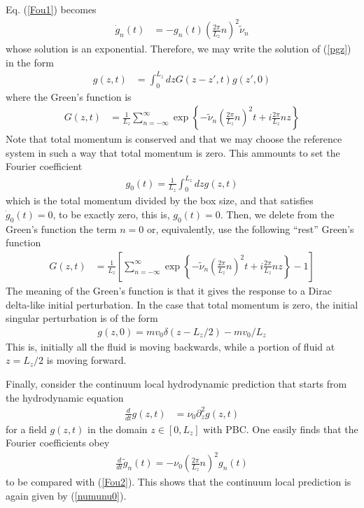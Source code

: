 \documentclass[a4paper,openright,12pt]{book}
\begin{document}
{Eq. (\ref{Fou1}) becomes
\begin{align}
\dot{g}_n(t)
&=-  {g}_n(t)\left(\frac{2\pi}{L_z}n\right)^2\tilde{\nu}_n
\label{Fou2}
\end{align}
whose solution is an exponential. Therefore, we may write the solution
of (\ref{pgz}) in the form 
\begin{align}
  g(z,t)&=\int_0^{L_z} dz G(z-z',t)g(z',0)  
\end{align}
where the Green's function is 
\begin{align}
  G(z,t)&=\frac{1}{L_z}\sum_{n=-\infty}^\infty \exp\left\{-\tilde{\nu}_n\left(\frac{2\pi}{L_z}n\right)^2t+
i\frac{2\pi}{L_z}nz\right\}
\label{Green1}
\end{align}
Note  that total  momentum is  conserved and  that we  may choose  the
reference system in such a way that total momentum is zero. This ammounts to
set the Fourier coefficient
\begin{align}
  g_0(t)=\frac{1}{L_z}\int_0^{L_z}dz g(z,t)
\end{align}
which  is  the total  momentum  divided  by  the  box size,  and  that
satisfies   $\dot{g}_0(t)=0$,   to   be   exactly   zero,   this   is,
$g_0(t)=0$. Then, we delete from the Green's function the term
$n=0$ or, equivalently, use the following ``rest'' Green's function
\begin{align}
  G(z,t)&=\frac{1}{L_z}\left[\sum_{n=-\infty}^\infty \exp\left\{-\tilde{\nu}_n\left(\frac{2\pi}{L_z}n\right)^2t+
i\frac{2\pi}{L_z}nz\right\}-1\right]
\end{align}
The meaning of the Green's function is that it gives the response to a Dirac delta-like initial
perturbation. In the case that total momentum is zero, the initial singular perturbation is of the form
\begin{align}
  g(z,0)=mv_0 \delta(z-L_z/2)-mv_0/L_z
\end{align}
This is, initially all the fluid is moving backwards, while a portion of fluid at $z=L_z/2$ is moving
forward.

Finally, consider the continuum local hydrodynamic prediction that starts from the hydrodynamic equation
\begin{align}
  \frac{d}{dt} g(z,t) &= \nu_0 \partial_z^2 g(z,t)
\label{Diff1}
\end{align}
for a field $g(z,t)$ in the domain $z\in[0,L_z]$ with PBC.
One easily finds that the Fourier coefficients obey
\begin{align}
  \frac{d}{dt}\tilde{g}_n(t)=-\nu_0\left(\frac{2\pi}{L_z}n\right)^2 g_n(t)
\label{Fou0}
\end{align}
to be compared with (\ref{Fou2}). This shows that the continuum  local prediction is again
given by (\ref{numunu0}).

}
\end{document}
